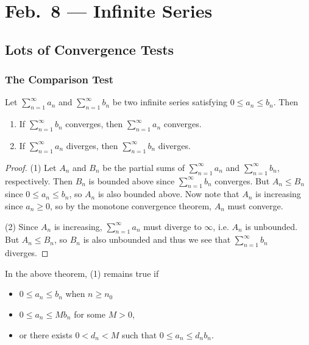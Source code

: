 \chapter{Feb.~8 --- Infinite Series}

\section{Lots of Convergence Tests}
\subsection{The Comparison Test}
\begin{theorem}
  Let $\sum_{n = 1}^\infty a_n$ and $\sum_{n = 1}^\infty b_n$ be two infinite series satisfying
  $0 \le a_n \le b_n$. Then
  \begin{enumerate}
    \item If $\sum_{n = 1}^\infty b_n$ converges, then $\sum_{n = 1}^\infty a_n$ converges.
    \item If $\sum_{n = 1}^\infty a_n$ diverges,
      then $\sum_{n = 1}^\infty b_n$ diverges.
  \end{enumerate}
\end{theorem}

\begin{proof}
  (1) Let $A_n$ and $B_n$ be the partial sums of
  $\sum_{n = 1}^\infty a_n$ and $\sum_{n = 1}^\infty b_n$, respectively.
  Then $B_n$ is bounded above since $\sum_{n = 1}^\infty b_n$ converges.
  But $A_n \le B_n$ since $0 \le a_n \le b_n$,
  so $A_n$ is also bounded above.
  Now note that $A_n$ is increasing since $a_n \ge 0$,
  so by the monotone convergence theorem,
  $A_n$ must converge.

  (2) Since $A_n$ is increasing,
  $\sum_{n = 1}^\infty a_n$ must diverge to $\infty$,
  i.e. $A_n$ is unbounded. But $A_n \le B_n$,
  so $B_n$ is also unbounded and thus we see that
  $\sum_{n = 1}^\infty b_n$ diverges.
\end{proof}

\begin{remark}
  In the above theorem, (1) remains true if
  \begin{itemize}
    \item $0 \le a_n \le b_n$ when $n \ge n_0$
    \item $0 \le a_n \le Mb_n$ for some $M > 0$,
    \item or there exists $0 < d_n < M$ such that
      $0 \le a_n \le d_n b_n$.
  \end{itemize}
\end{remark}


